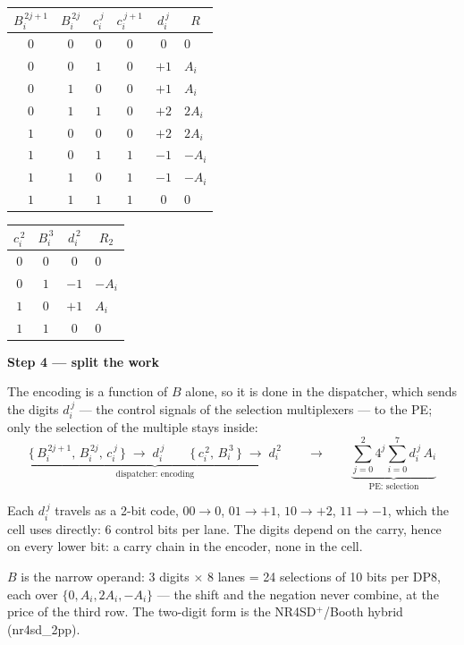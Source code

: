\documentclass[fleqn]{article}
\begin{document}
\begin{center}
\renewcommand{\arraystretch}{1.2}
\begin{tabular}{c c c | c | c | l}
$B_i^{\,2j+1}$ & $B_i^{\,2j}$ & $c_i^{\,j}$ & $c_i^{\,j+1}$ & $d_i^{\,j}$ & \multicolumn{1}{c}{$R$} \\
\hline
$0$ & $0$ & $0$ & $0$ & $0$  & $0$ \\
$0$ & $0$ & $1$ & $0$ & $+1$ & $A_i$ \\
$0$ & $1$ & $0$ & $0$ & $+1$ & $A_i$ \\
$0$ & $1$ & $1$ & $0$ & $+2$ & $2A_i$ \\
$1$ & $0$ & $0$ & $0$ & $+2$ & $2A_i$ \\
$1$ & $0$ & $1$ & $1$ & $-1$ & $-A_i$ \\
$1$ & $1$ & $0$ & $1$ & $-1$ & $-A_i$ \\
$1$ & $1$ & $1$ & $1$ & $0$  & $0$ \\
\end{tabular}
\qquad\qquad
\begin{tabular}{c c | c | l}
$c_i^{\,2}$ & $B_i^{\,3}$ & $d_i^{\,2}$ & \multicolumn{1}{c}{$R_2$} \\
\hline
$0$ & $0$ & $0$  & $0$ \\
$0$ & $1$ & $-1$ & $-A_i$ \\
$1$ & $0$ & $+1$ & $A_i$ \\
$1$ & $1$ & $0$  & $0$ \\
\end{tabular}
\end{center}

\vspace{0.8em}

\noindent\textbf{Step 4 --- split the work}

\noindent The encoding is a function of $B$ alone, so it is done in the dispatcher, which
sends the digits $d_i^{\,j}$ --- the control signals of the selection multiplexers --- to the
PE; only the selection of the multiple stays inside:
\[
\underbrace{\bigl\{\, B_i^{\,2j+1},\, B_i^{\,2j},\, c_i^{\,j} \,\bigr\} \;\longrightarrow\; d_i^{\,j}
  \qquad
  \bigl\{\, c_i^{\,2},\, B_i^{\,3} \,\bigr\} \;\longrightarrow\; d_i^{\,2}}_{\textstyle \text{dispatcher: encoding}}
\qquad\longrightarrow\qquad
\underbrace{\sum_{j=0}^{2} 4^{j} \sum_{i=0}^{7} d_i^{\,j} \, A_i}_{\textstyle \text{PE: selection}}
\]

\noindent Each $d_i^{\,j}$ travels as a 2-bit code, $00 \to 0$, $01 \to +1$, $10 \to +2$,
$11 \to -1$, which the cell uses directly: 6 control bits per lane. The digits depend on
the carry, hence on every lower bit: a carry chain in the encoder, none in the cell.

\vspace{0.8em}

\noindent $B$ is the narrow operand: 3 digits $\times$ 8 lanes = 24 selections of
10 bits per DP8, each over $\{0, A_i, 2A_i, -A_i\}$ --- the shift and the negation never
combine, at the price of the third row. The two-digit form is the NR4SD$^{+}$/Booth
hybrid (nr4sd\_2pp).
\end{document}

